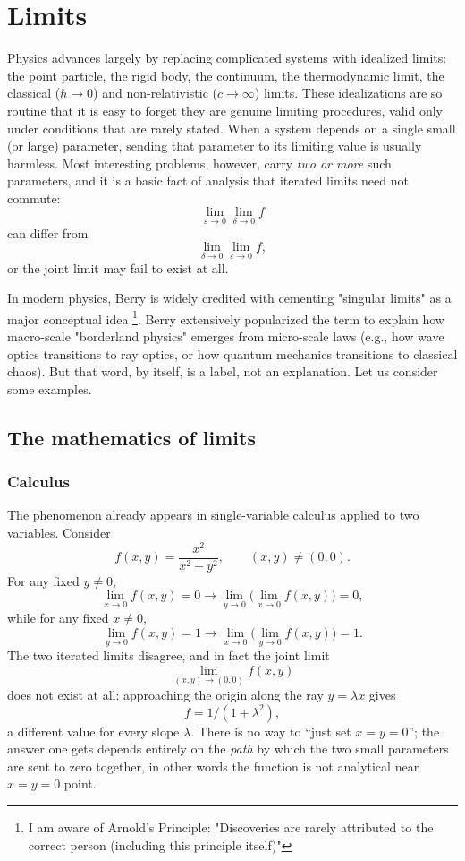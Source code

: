 \chapter{Limits }
\label{lm}

Physics advances largely by replacing complicated systems with
idealized limits: the point particle, the rigid body, the
continuum, the thermodynamic limit, the classical ($\hbar\to0$) 
and non-relativistic ($ c \to \infty $)
limits. These idealizations are so routine that it is easy to
forget they are genuine limiting procedures, valid only under
conditions that are rarely stated. When a system depends on a
single small (or large) parameter, sending that parameter to its
limiting value is usually harmless. Most interesting problems,
however, carry \emph{two or more} such parameters, and it is a
basic fact of analysis that iterated limits need not commute:
\[\lim_{\varepsilon\to0}\lim_{\delta\to0} f\]
can differ from
\[\lim_{\delta\to0}\lim_{\varepsilon\to0} f,\]
or the joint limit
may fail to exist at all. 

In modern physics, Berry is widely credited with cementing "singular limits" as
a major conceptual idea \footnote{I am aware of Arnold's Principle:
"Discoveries are rarely attributed to the correct person (including this
principle itself)"}. Berry extensively popularized the term to explain how
macro-scale "borderland physics" emerges from micro-scale laws (e.g., how wave
optics transitions to ray optics, or how quantum mechanics transitions to
classical chaos). But that word, by itself, is a label, not an explanation. Let
us consider some examples.

\section{The mathematics of  limits}
\label{lm:ma}

\subsection{Calculus}
The phenomenon  already appears in
single-variable calculus applied to two variables. Consider
\begin{equation}
f(x,y) = \frac{x^2}{x^2+y^2}, \qquad (x,y)\neq(0,0).
\end{equation}
For any fixed $y\neq0$,
\begin{equation}
\lim_{x\to0}f(x,y)=0\longrightarrow\lim_{y\to0}\Big(\lim_{x\to0}f(x,y)\Big)=0,
\end{equation}
while for any fixed $x\neq0$,
\begin{equation}
\lim_{y\to0}f(x,y)=1\longrightarrow\lim_{x\to0}\Big(\lim_{y\to0}f(x,y)\Big)=1.
\end{equation}
The two iterated limits disagree, and in fact the joint limit
\[\lim_{(x,y)\to(0,0)}f(x,y)\]
does not exist at all: approaching
the origin along the ray $y=\lambda x$ gives 
\[f =1/(1+\lambda^2),\]
a different value for every slope $\lambda$.
There is no way to ``just set $x=y=0$''; the answer one gets
depends entirely on the \emph{path} by which the two small
parameters are sent to zero together, in other words the 
function is not analytical near $x=y=0$ point.

